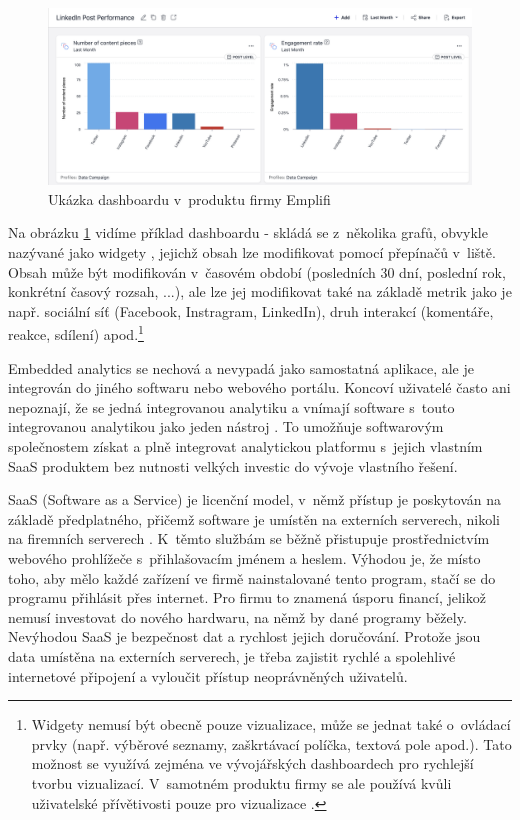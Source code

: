 \documentclass[czech, bc, kiv, he, iso690numb]{fasthesis}
\begin{document}
\begin{figure}
	\centering
	\includegraphics[width=1\textwidth]{pictures/emplifi-dashboard-example-kopie.png}
	\caption{Ukázka dashboardu v~produktu firmy Emplifi \cite{emplifidashboardIMAGE}}
	\label{fig:emplifiDashUkazka}
\end{figure}

Na obrázku \ref{fig:emplifiDashUkazka} vidíme příklad dashboardu - skládá se z~několika grafů, obvykle nazývané jako widgety \cite{emplifiDashboard}, jejichž obsah lze modifikovat pomocí přepínačů v~liště. Obsah může být modifikován v~časovém období (posledních 30 dní, poslední rok, konkrétní časový rozsah, ...), ale lze jej modifikovat také na základě metrik jako je např. sociální síť (Facebook, Instragram, LinkedIn), druh interakcí (komentáře, reakce, sdílení) apod.\footnote{Widgety nemusí být obecně pouze vizualizace, může se jednat také o~ovládací prvky (např. výběrové seznamy, zaškrtávací políčka, textová pole apod.). Tato možnost se využívá zejména ve vývojářských dashboardech pro rychlejší tvorbu vizualizací. V~samotném produktu firmy se ale používá kvůli uživatelské přívětivosti pouze pro vizualizace \cite{emplifiDashboard}. 
}

Embedded analytics se nechová a nevypadá jako samostatná aplikace, ale je integrován do jiného softwaru nebo webového portálu. Koncoví uživatelé často ani nepoznají, že se jedná
integrovanou analytiku a vnímají software s~touto integrovanou analytikou jako jeden nástroj \cite{goodDataEmbedded}. To umožňuje softwarovým společnostem získat a plně
integrovat analytickou platformu s~jejich vlastním SaaS produktem bez nutnosti velkých investic do vývoje vlastního řešení. 

SaaS (Software as a Service) je licenční model, v~němž přístup je poskytován na základě předplatného, přičemž software je umístěn na externích serverech, nikoli na firemních serverech \cite{saasDefinition}.
K~těmto službám se běžně přistupuje prostřednictvím webového prohlížeče s~přihlašovacím jménem a heslem. Výhodou je, že místo toho, aby mělo každé zařízení ve firmě nainstalované
tento program, stačí se do programu přihlásit přes internet. Pro firmu to znamená úsporu financí, jelikož nemusí investovat do nového hardwaru, na němž by dané programy běžely. 
Nevýhodou SaaS je bezpečnost dat a rychlost jejich doručování. Protože jsou data umístěna na externích serverech, je třeba zajistit rychlé a spolehlivé internetové připojení a vyloučit
přístup neoprávněných uživatelů.
\end{document}
